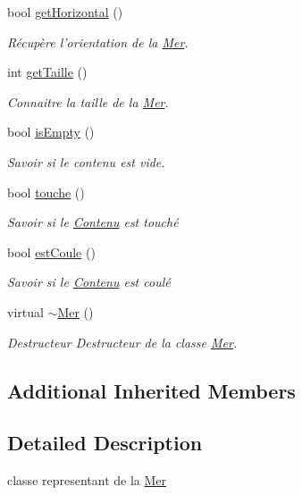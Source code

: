 \begin{DoxyCompactItemize}
bool \hyperlink{classMer_aa2cfaf3bb10d817c535b843724759bc7}{get\+Horizontal} ()
\begin{DoxyCompactList}\small\item\em Récupère l'orientation de la \hyperlink{classMer}{Mer}. \end{DoxyCompactList}\item 
int \hyperlink{classMer_ad3662e679f566da98a77b585d1699a7e}{get\+Taille} ()
\begin{DoxyCompactList}\small\item\em Connaitre la taille de la \hyperlink{classMer}{Mer}. \end{DoxyCompactList}\item 
bool \hyperlink{classMer_ac76c2299715ae08f07e8a9fc0821b032}{is\+Empty} ()
\begin{DoxyCompactList}\small\item\em Savoir si le contenu est vide. \end{DoxyCompactList}\item 
bool \hyperlink{classMer_a2ec6ecba14a8f737335720f3dffe9877}{touche} ()
\begin{DoxyCompactList}\small\item\em Savoir si le \hyperlink{classContenu}{Contenu} est touché \end{DoxyCompactList}\item 
bool \hyperlink{classMer_aa1a5b5633f2d7590e3074bf70a867ee0}{est\+Coule} ()
\begin{DoxyCompactList}\small\item\em Savoir si le \hyperlink{classContenu}{Contenu} est coulé \end{DoxyCompactList}\item 
\hypertarget{classMer_a5c47272a53feac903046599b3c638d2c}{virtual \hyperlink{classMer_a5c47272a53feac903046599b3c638d2c}{$\sim$\+Mer} ()}\label{classMer_a5c47272a53feac903046599b3c638d2c}

\begin{DoxyCompactList}\small\item\em Destructeur Destructeur de la classe \hyperlink{classMer}{Mer}. \end{DoxyCompactList}\end{DoxyCompactItemize}
\subsection*{Additional Inherited Members}


\subsection{Detailed Description}
classe representant de la \hyperlink{classMer}{Mer} 

